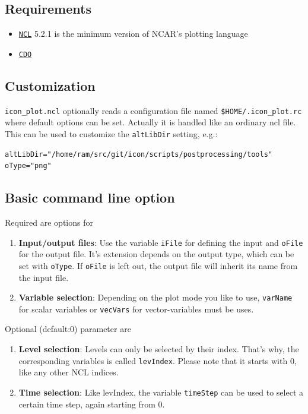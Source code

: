 \subsection{Requirements}
\begin{itemize}
\item \href{http://www.ncl.ucar.edu}{\tt NCL} 5.2.1 is the minimum version of NCAR's plotting language
\item \href{https://code.zmaw.de/projects/cdo}{\tt CDO}
\end{itemize}

\subsection{Customization}
{\tt icon\_plot.ncl} optionally reads a configuration file named {\tt \$HOME/.icon\_plot.rc} where default options can be set. Actually it is handled like an ordinary ncl file. This can be used to customize the {\tt altLibDir} setting, e.g.:

\begin{small}
\begin{verbatim}
altLibDir="/home/ram/src/git/icon/scripts/postprocessing/tools" 
oType="png" 
\end{verbatim}
\end{small}

\subsection{Basic command line option}
Required are options for
\begin{enumerate}
\item \textbf{Input/output files}: Use the variable {\tt iFile} for defining the input and {\tt oFile} for the output file. It's extension depends on the output type, which can be set with {\tt oType}. If {\tt oFile} is left out, the output file will inherit its name from the input file.
\item \textbf{Variable selection}: Depending on the plot mode you like to use, {\tt varName} for scalar variables or {\tt vecVars} for vector-variables must be uses.
\end{enumerate}

Optional (default:0) parameter are
\begin{enumerate}
\item \textbf{Level selection}: Levels can only be selected by their index. That's why, the corresponding variables is called {\tt levIndex}. Please note that it starts with 0, like any other NCL indices.
\item \textbf{Time selection}: Like levIndex, the variable {\tt timeStep} can be used to select a certain time step, again starting from 0.
\end{enumerate}

